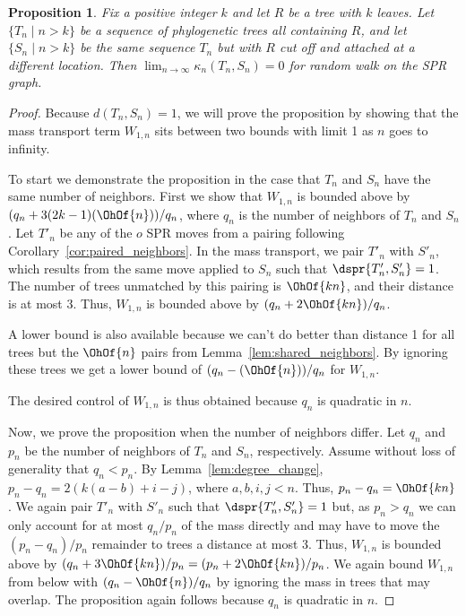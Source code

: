 \documentclass{amsart}
\newtheorem{proposition}[theorem]{Proposition}
\begin{document}
\begin{proposition}
Fix a positive integer $k$ and let $R$ be a tree with $k$ leaves.
Let $\{T_n \mid n > k\}$ be a sequence of phylogenetic trees all containing $R$, and let $\{S_n \mid n > k\}$ be the same sequence $T_n$ but with $R$ cut off and attached at a different location.
Then $\lim_{n \rightarrow \infty} \kappa_n(T_n, S_n) = 0$ for  random walk on the SPR graph.
\end{proposition}
\begin{proof}
Because $d(T_n, S_n) = 1$, we will prove the proposition by showing that the mass transport term $W_{1,n}$ sits between two bounds with limit 1 as $n$ goes to infinity.

To start we demonstrate the proposition in the case that $T_n$ and $S_n$ have the same number of neighbors.
First we show that $W_{1,n}$ is bounded above by $(q_n+3(2k-1)(\OhOf{n}))/q_n$, where $q_n$ is the number of neighbors of $T_n$ and $S_n$.
Let $T'_n$ be any of the $o$ SPR moves from a pairing following Corollary~\ref{cor:paired_neighbors}.
In the mass transport, we pair $T'_n$ with $S'_n$, which results from the same move applied to $S_n$ such that $\dspr{T'_n, S'_n} = 1$.
The number of trees unmatched by this pairing is $\OhOf{kn}$, and their distance is at most 3.
Thus, $W_{1,n}$ is bounded above by $(q_n + 2\OhOf{kn}) / q_n$.

A lower bound is also available because we can't do better than distance 1 for all trees but the $\OhOf{n}$ pairs from Lemma~\ref{lem:shared_neighbors}.
By ignoring these trees we get a lower bound of $(q_n -(\OhOf{n}))/q_n$ for $W_{1,n}$.

The desired control of $W_{1,n}$ is thus obtained because $q_n$ is quadratic in $n$.

Now, we prove the proposition when the number of neighbors differ.
Let $q_n$ and $p_n$ be the number of neighbors of $T_n$ and $S_n$, respectively.
Assume without loss of generality that $q_n < p_n$.
By Lemma~\ref{lem:degree_change}, $p_n - q_n = 2(k(a-b) + i - j)$, where $a,b,i,j < n$.
Thus, $p_n - q_n = \OhOf{kn}$.
We again pair $T'_n$ with $S'_n$ such that $\dspr{T'_n, S'_n}=1$ but, as $p_n > q_n$ we can only account for at most $q_n / p_n$ of the mass directly and may have to move the $(p_n - q_n) / p_n$ remainder to trees a distance at most 3.
Thus, $W_{1,n}$ is bounded above by $(q_n + 3\OhOf{kn}) / p_n = (p_n + 2\OhOf{kn}) / p_n$.
We again bound $W_{1,n}$ from below with $(q_n - \OhOf{n}) / q_n$ by ignoring the mass in trees that may overlap.
The proposition again follows because $q_n$ is quadratic in $n$.

\end{proof}
\end{document}

